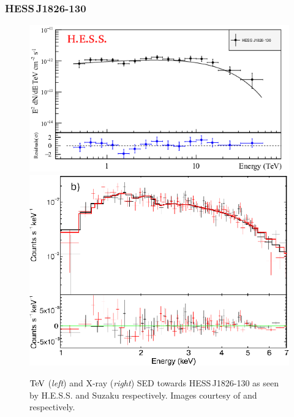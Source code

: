 \subsubsection{HESS\,J1826-130}
\begin{figure}[h!]
	\centering
	\includegraphics[height=0.18\textheight]{04_Introduction/Images/pulsar_wind_nebula/1826_energy_flux.png}
    \includegraphics[height=0.18\textheight]{04_Introduction/Images/pulsar_wind_nebula/hess_j1826_130_xray.eps}
	\caption{$\TeV$ (\textit{left}) and X-ray (\textit{right}) SED towards \mbox{HESS\,J1826-130} as seen by H.E.S.S. and Suzaku respectively. Images courtesy of \cite{2020A&A...644A.112H} and \cite{2019A&A...623A.115D} respectively.}
	\label{fig:chapter1_hess_j1826_SED}
\end{figure}



